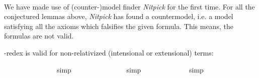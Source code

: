 \begin{isabellebody}
\ %
%
%
%
%
\begin{isamarkuptext}%
We have made use of (counter-)model finder \emph{Nitpick} \cite{Nitpick} for the first time.  
  For all the conjectured lemmas above, \emph{Nitpick} has found a countermodel, i.e. a model satisfying all 
  the axioms which falsifies the given formula. This means, the formulas are not valid.%
\end{isamarkuptext}\isamarkuptrue%
%
\begin{isamarkuptext}%
\isa{{\isasymbeta}{\isasymeta}}-redex is valid for non-relativized (intensional or extensional) terms:%
\end{isamarkuptext}\isamarkuptrue%
\ \ \isamarkupfalse%
\ {\isachardoublequoteopen}{\isasymlfloor}{\isacharparenleft}{\isacharparenleft}{\isasymlambda}{\isasymalpha}{\isachardot}\ {\isasymphi}\ {\isasymalpha}{\isacharparenright}\ \ {\isacharparenleft}{\isasymtau}{\isacharcolon}{\isacharcolon}{\isasymup}{\isasymzero}{\isacharparenright}{\isacharparenright}\ \isactrlbold {\isasymleftrightarrow}\ {\isacharparenleft}{\isasymphi}\ \ {\isasymtau}{\isacharparenright}{\isasymrfloor}{\isachardoublequoteclose}%
\ %
%
\isamarkupfalse%
\ simp%
%
%
\isanewline
\ \ \isamarkupfalse%
\ {\isachardoublequoteopen}{\isasymlfloor}{\isacharparenleft}{\isacharparenleft}{\isasymlambda}{\isasymalpha}{\isachardot}\ {\isasymphi}\ {\isasymalpha}{\isacharparenright}\ \ {\isacharparenleft}{\isasymtau}{\isacharcolon}{\isacharcolon}{\isasymzero}{\isacharparenright}{\isacharparenright}\ \isactrlbold {\isasymleftrightarrow}\ {\isacharparenleft}{\isasymphi}\ \ {\isasymtau}{\isacharparenright}{\isasymrfloor}{\isachardoublequoteclose}%
\ %
%
\isamarkupfalse%
\ simp%
%
%
\isanewline
\ \ \isamarkupfalse%
\ {\isachardoublequoteopen}{\isasymlfloor}{\isacharparenleft}{\isacharparenleft}{\isasymlambda}{\isasymalpha}{\isachardot}\ \isactrlbold {\isasymbox}{\isasymphi}\ {\isasymalpha}{\isacharparenright}\ {\isacharparenleft}{\isasymtau}{\isacharcolon}{\isacharcolon}{\isasymup}{\isasymzero}{\isacharparenright}{\isacharparenright}\ \isactrlbold {\isasymleftrightarrow}\ {\isacharparenleft}\isactrlbold {\isasymbox}{\isasymphi}\ {\isasymtau}{\isacharparenright}{\isasymrfloor}{\isachardoublequoteclose}%
\ %
%
\isamarkupfalse%
\ simp%
%
%
\isanewline
\ \ \isamarkupfalse%
\ {\isachardoublequoteopen}{\isasymlfloor}{\isacharparenleft}{\isacharparenleft}{\isasymlambda}{\isasymalpha}{\isachardot}\ \isactrlbold {\isasymbox}{\isasymphi}\ {\isasymalpha}{\isacharparenright}\ {\isacharparenleft}{\isasymtau}{\isacharcolon}{\isacharcolon}{\isasymzero}{\isacharparenright}{\isacharparenright}\ \isactrlbold {\isasymleftrightarrow}\ {\isacharparenleft}\isactrlbold {\isasymbox}{\isasymphi}\ {\isasymtau}{\isacharparenright}{\isasymrfloor}{\isachardoublequoteclose}%

\end{isabellebody}
